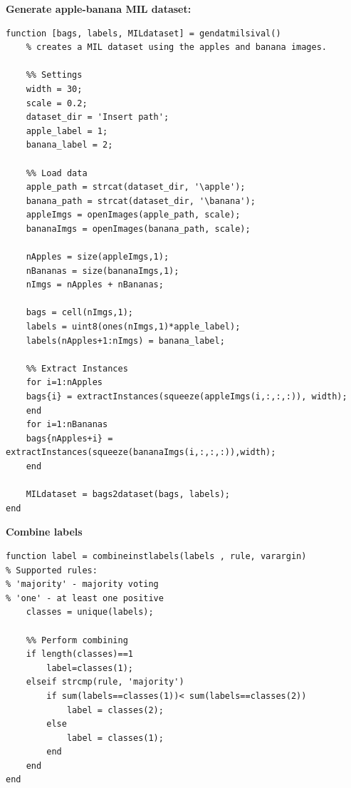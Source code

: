 \documentclass [a4paper] {report}
\begin{document}
	\newpage
	\noindent
	\textbf{Generate apple-banana MIL dataset:}
	
	\begin{lstlisting}
function [bags, labels, MILdataset] = gendatmilsival()
	% creates a MIL dataset using the apples and banana images.
	
	%% Settings
	width = 30;
	scale = 0.2;
	dataset_dir = 'Insert path';
	apple_label = 1;
	banana_label = 2;
	
	%% Load data
	apple_path = strcat(dataset_dir, '\apple');
	banana_path = strcat(dataset_dir, '\banana');
	appleImgs = openImages(apple_path, scale);
	bananaImgs = openImages(banana_path, scale);
	
	nApples = size(appleImgs,1);
	nBananas = size(bananaImgs,1);
	nImgs = nApples + nBananas;
	
	bags = cell(nImgs,1);   
	labels = uint8(ones(nImgs,1)*apple_label);
	labels(nApples+1:nImgs) = banana_label;
	
	%% Extract Instances
	for i=1:nApples
	bags{i} = extractInstances(squeeze(appleImgs(i,:,:,:)), width);
	end
	for i=1:nBananas
	bags{nApples+i} = extractInstances(squeeze(bananaImgs(i,:,:,:)),width); 
	end
	
	MILdataset = bags2dataset(bags, labels);
end
	\end{lstlisting}

	\noindent
	\textbf{Combine labels}
	\begin{lstlisting}
function label = combineinstlabels(labels , rule, varargin)
% Supported rules:
% 'majority' - majority voting
% 'one' - at least one positive
	classes = unique(labels);
	
	%% Perform combining
	if length(classes)==1
		label=classes(1);
	elseif strcmp(rule, 'majority')
		if sum(labels==classes(1))< sum(labels==classes(2))
			label = classes(2);
		else
			label = classes(1);
		end	
	end
end	
	\end{lstlisting}
	
\end{document}
